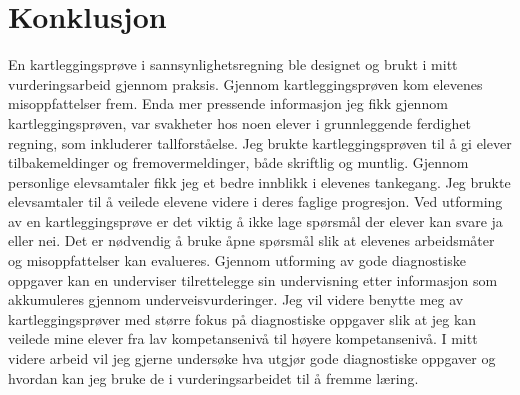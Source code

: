 \documentclass[main.tex]{subfiles}
\begin{document}
\section*{Konklusjon}
\label{sec:6}
En kartleggingsprøve i sannsynlighetsregning ble designet og brukt i mitt vurderingsarbeid
gjennom praksis. Gjennom kartleggingsprøven kom elevenes misoppfattelser frem. Enda mer pressende 
informasjon jeg fikk gjennom kartleggingsprøven, var svakheter hos noen elever i grunnleggende 
ferdighet regning, som inkluderer tallforståelse. Jeg brukte kartleggingsprøven til å gi elever tilbakemeldinger 
og fremovermeldinger, både skriftlig og muntlig. Gjennom personlige elevsamtaler fikk jeg et bedre 
innblikk i elevenes tankegang. Jeg brukte elevsamtaler til å veilede elevene videre i deres faglige progresjon. 
Ved utforming av en kartleggingsprøve er det viktig å ikke lage spørsmål der elever kan svare ja eller nei. 
Det er nødvendig å bruke åpne spørsmål slik at elevenes arbeidsmåter og misoppfattelser kan evalueres. 
Gjennom utforming av gode diagnostiske oppgaver kan en underviser tilrettelegge sin undervisning etter 
informasjon som akkumuleres gjennom underveisvurderinger. Jeg vil videre benytte meg av kartleggingsprøver 
med større fokus på diagnostiske oppgaver slik at jeg kan veilede mine elever fra lav 
kompetansenivå til høyere kompetansenivå. I mitt videre arbeid vil jeg gjerne undersøke hva 
utgjør gode diagnostiske oppgaver og hvordan kan jeg bruke de i vurderingsarbeidet til å fremme 
læring.
\end{document}
